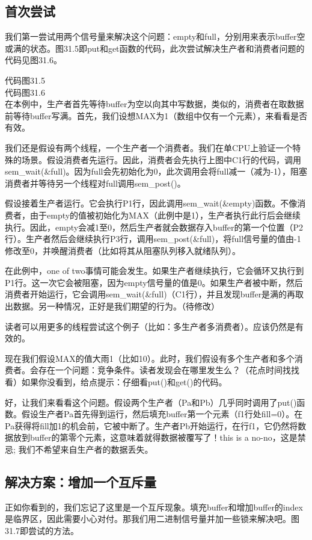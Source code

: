 \subsection*{首次尝试}
我们第一尝试用两个信号量来解决这个问题：empty和full，分别用来表示buffer空或满的状态。图31.5即put和get函数的代码，此次尝试解决生产者和消费者问题的代码见图31.6。

代码图31.5\\

代码图31.6\\

在本例中，生产者首先等待buffer为空以向其中写数据，类似的，消费者在取数据前等待buffer写满。首先，我们设想MAX为1（数组中仅有一个元素），来看看是否有效。

我们还是假设有两个线程，一个生产者一个消费者。我们在单CPU上验证一个特殊的场景。假设消费者先运行。因此，消费者会先执行上图中C1行的代码，调用sem\_wait(\&full)。因为full会先初始化为0，此次调用会将full减一（减为-1），阻塞消费者并等待另一个线程对full调用sem\_post()。

假设接着生产者运行。它会执行P1行，因此调用sem\_wait(\&empty)函数。不像消费者，由于empty的值被初始化为MAX（此例中是1），生产者执行此行后会继续执行。因此，empty会减1至0，然后生产者就会数据存入buffer的第一个位置（P2行）。生产者然后会继续执行P3行，调用sem\_post(\&full)，将full信号量的值由-1修改至0，并唤醒消费者（比如将其从阻塞队列移入就绪队列）。

在此例中，one of two事情可能会发生。如果生产者继续执行，它会循环又执行到P1行。这一次它会被阻塞，因为empty信号量的值是0。如果生产者被中断，然后消费者开始运行，它会调用sem\_wait(\&full)（C1行），并且发现buffer是满的再取出数据。另一种情况，正好是我们期望的行为。（待修改）

读者可以用更多的线程尝试这个例子（比如：多生产者多消费者）。应该仍然是有效的。

现在我们假设MAX的值大雨1（比如10）。此时，我们假设有多个生产者和多个消费者。会存在一个问题：竞争条件。读者发现会在哪里发生么？（花点时间找找看）如果你没看到，给点提示：仔细看put()和get()的代码。

好，让我们来看看这个问题。假设两个生产者（Pa和Pb）几乎同时调用了put()函数。假设生产者Pa首先得到运行，然后填充buffer第一个元素（f1行处fill=0）。在Pa获得将fill加1的机会前，它被中断了。生产者Pb开始运行，在行f1，它仍然将数据放到buffer的第零个元素，这意味着就得数据被覆写了！this is a no-no，这是禁忌; 我们不希望来自生产者的数据丢失。


\subsection*{解决方案：增加一个互斥量}
正如你看到的，我们忘记了这里是一个互斥现象。填充buffer和增加buffer的index是临界区，因此需要小心对付。那我们用二进制信号量并加一些锁来解决吧。图31.7即尝试的方法。


